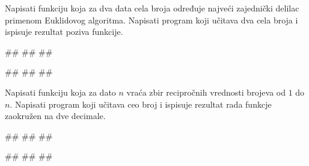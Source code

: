 \begin{Exercise}[label=v1.4_03] 
Napisati funkciju  koja za dva data
cela broja određuje najveći zajednički delilac primenom Euklidovog
algoritma. Napisati program koji učitava dva cela broja i ispisuje
rezultat poziva funkcije.

\begin{miditest}
\begin{upotreba}{1}
#\naslovInt#
##
##
\end{upotreba}
\end{miditest}
\begin{miditest}
\begin{upotreba}{2}
#\naslovInt#
##
##
\end{upotreba}
\end{miditest}


\end{Exercise}
\ifresenja 
\begin{Answer}[ref=v1.4_03]
\end{Answer} 
\fi

\begin{Exercise}[label=v1.4_04] 
Napisati funkciju  koja za dato
$n$ vraća zbir recipročnih vrednosti brojeva od $1$ do $n$. Napisati
program koji učitava ceo broj i ispisuje rezultat rada funkcje
zaokružen na dve decimale.

\begin{miditest}
\begin{upotreba}{1}
#\naslovInt#
##
##
\end{upotreba}
\end{miditest}
\begin{miditest}
\begin{upotreba}{2}
#\naslovInt#
##
##
\end{upotreba}
\end{miditest}

\end{Exercise}
\ifresenja 
\begin{Answer}[ref=v1.4_04]
\end{Answer} 
\fi


